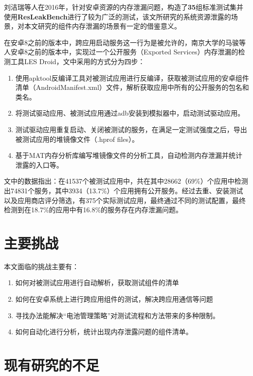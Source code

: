 刘洁瑞等人在2016年，针对安卓资源的内存泄漏问题，构造了\textbf{35}组标准测试集并使用\textbf{ResLeakBench}\cite{liu2016}进行了较为广泛的测试，该文所研究的系统资源泄露的场景，对本文研究的组件内存泄漏的场景有一定的借鉴意义。
\newline

在安卓8之前的版本中，跨应用启动服务这一行为是被允许的，南京大学的马骏等人安卓8之前的版本中，实现过一个公开服务（Exported Services）内存泄漏的检测工具LES Droid\cite{jun2018lesdroid}，文中采用的方式分为四步：

\begin{enumerate}
	\item 使用apktool反编译工具\cite{apktool}对被测试应用进行反编译，获取被测试应用的安卓组件清单（AndroidManifest.xml）文件，解析获取应用中所有的公开服务的包名和类名。
	\item 将测试驱动应用、被测试应用通过adb安装到模拟器中，启动测试驱动应用。
	\item 测试驱动应用重复启动、关闭被测试的服务，在满足一定测试强度之后，导出被测试应用的堆镜像文件（.hprof files）。
	\item 基于MAT内存分析库\cite{mat}编写堆镜像文件的分析工具，自动检测内存泄漏并统计泄露的入口等。
\end{enumerate}

\label{pre-result}
文中的数据指出：在41537个被测试应用中，共在其中28662（69\%）个应用中检测出74831个服务，其中3934（13.7\%）个应用拥有公开服务。经过去重、安装测试以及应用商店评分筛选，有375个实际测试应用，最终通过不同的测试配置，最终检测到在18.7\%的应用中有16.8\%的服务存在内存泄漏问题。

\section{主要挑战}

本文面临的挑战主要有：

\begin{enumerate}
	\item 如何对被测试应用进行自动解析，获取测试组件的清单
	\item 如何在安卓系统上进行跨应用组件的测试，解决跨应用通信等问题
	\item 寻找办法能解决“电池管理策略”对测试流程和方法带来的多种限制。
	\item 如何自动化进行分析，统计出现内存泄露问题的组件清单。
\end{enumerate}

\section{现有研究的不足}

